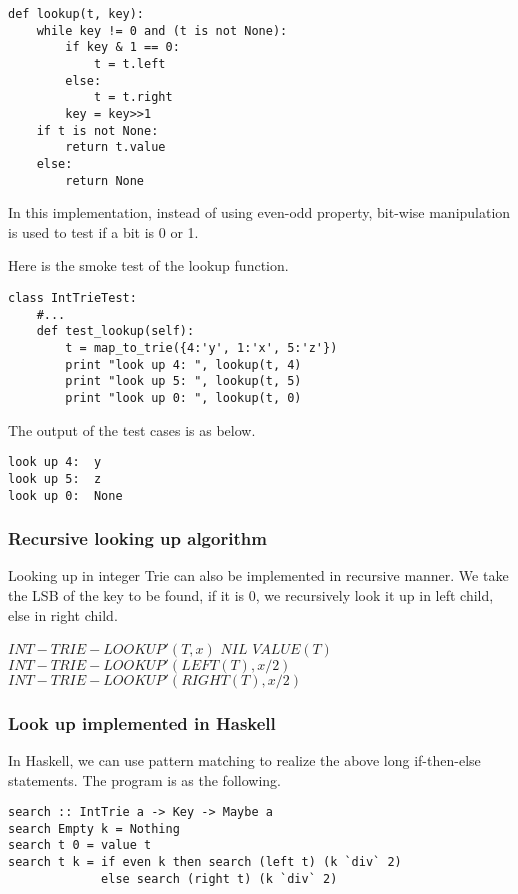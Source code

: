 \documentclass{article}
\begin{document}
\lstset{language=Python}
\begin{lstlisting}
def lookup(t, key):
    while key != 0 and (t is not None):
        if key & 1 == 0:
            t = t.left
        else:
            t = t.right
        key = key>>1
    if t is not None:
        return t.value
    else:
        return None
\end{lstlisting}

In this implementation, instead of using even-odd property, bit-wise
manipulation is used to test if a bit is 0 or 1.

Here is the smoke test of the lookup function.

\begin{lstlisting}
class IntTrieTest:
    #...
    def test_lookup(self):
        t = map_to_trie({4:'y', 1:'x', 5:'z'})
        print "look up 4: ", lookup(t, 4)
        print "look up 5: ", lookup(t, 5)
        print "look up 0: ", lookup(t, 0)
\end{lstlisting}

The output of the test cases is as below.

\begin{verbatim}
look up 4:  y
look up 5:  z
look up 0:  None
\end{verbatim}

\subsubsection{Recursive looking up algorithm}

Looking up in integer Trie can also be implemented in recursive manner.
We take the LSB of the key to be found, if it is 0, we recursively look
it up in left child, else in right child.

\begin{algorithmic}
\STATE $INT-TRIE-LOOKUP'(T, x)$
    \RETURN $NIL$
    \RETURN $VALUE(T)$
    \RETURN $INT-TRIE-LOOKUP'(LEFT(T), x/2)$
  \ELSE
    \RETURN $INT-TRIE-LOOKUP'(RIGHT(T), x/2)$
  \ENDIF
\end{algorithmic}

\subsubsection*{Look up implemented in Haskell}
In Haskell, we can use pattern matching to realize the above long if-then-else statements.
The program is as the following.

\lstset{language=Haskell}
\begin{lstlisting}
search :: IntTrie a -> Key -> Maybe a
search Empty k = Nothing
search t 0 = value t
search t k = if even k then search (left t) (k `div` 2)
             else search (right t) (k `div` 2)
\end{lstlisting}
\end{document}
